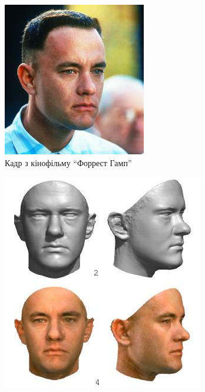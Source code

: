 \begin{figure}[h]
  \centering
  \begin{subfigure}[b]{0.3\textwidth}
    \centering
    \includegraphics[width=\textwidth]{images/forrest-gump}
    \caption{Кадр з кінофільму ``Форрест Гамп''}
    \label{fig:bfm:forrest-gump}
  \end{subfigure}
  \begin{subfigure}[b]{0.3\textwidth}
    \centering
    \includegraphics[width=\textwidth]{images/forrest-gump-model}

\end{subfigure}
\end{figure}
